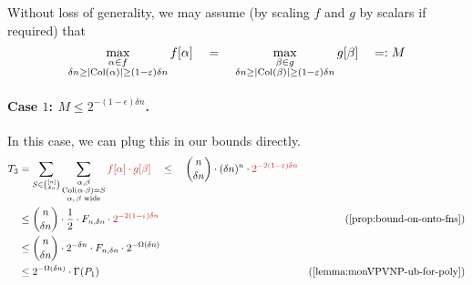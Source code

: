 Without loss of generality, we may assume (by scaling $f$ and $g$ by scalars if required) that
\[
  \max_{\substack{\alpha \in f \\ \delta n \geq \left|\operatorname{Col}(\alpha)\right| \geq (1-\varepsilon)\delta n}} f[\alpha] \quad=\quad   \max_{\substack{\beta \in g \\ \delta n \geq \left|\operatorname{Col}(\beta)\right| \geq (1-\varepsilon)\delta n}}  g[\beta] \quad =: M 
\]
\paragraph{Case $1$: $M \leq 2^{-(1-\epsilon) \delta n}$.} In this case, we can plug this in our bounds directly.
\begin{align*}
  T_3 & = \sum_{S \in \binom{[n]}{\delta n}} \sum_{\substack{\alpha, \beta\\ \Col(\alpha \cdot \beta) = S \\ \text{$\alpha,\beta$ wide}}} \textcolor{BrickRed}{f[\alpha] \cdot g[\beta]} \quad \leq\quad \binom{n}{\delta n} \cdot (\delta n)^n\cdot \textcolor{BrickRed}{2^{-2(1-\epsilon)\delta n}} \\
      & \leq \binom{n}{\delta n} \cdot \frac{1}{2} \cdot F_{n,\delta n} \cdot \textcolor{BrickRed}{2^{-2(1-\epsilon)\delta n}} & \text{(\autoref{prop:bound-on-onto-fns})}\\
      & \leq \binom{n}{\delta n} \cdot 2^{-\delta n} \cdot F_{n,\delta n} \cdot 2^{-\Omega(\delta n)}\\
      & \leq 2^{-\Omega(\delta n)} \cdot \Gamma(P_1) & \text{(\autoref{lemma:monVPVNP-ub-for-poly})}
\end{align*}


